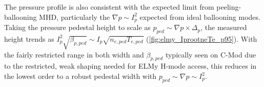 \documentclass[ twoside,openright,titlepage,numbers=noenddot,headinclude,%
                footinclude=true,cleardoublepage=empty,abstractoff, %
                BCOR=5mm,paper=letter,fontsize=11pt,%
                ngerman,american,%
                ]{scrreprt}
\begin{document}
\begin{figure}[h]
 \pushtooutside
\end{figure}

\noindent The pressure profile is also consistent with the expected limit from peeling-ballooning MHD, particularly the $\nabla p \sim I_p^2$ expected from ideal ballooning modes.  Taking the pressure pedestal height to scale as $p_{ped} \sim \nabla p \times \Delta_{p}$, the measured height trends as $I_p^2 \sqrt{\beta_{p,ped}} \sim I_p \sqrt{n_{e,ped} T_{e,ped}}$ (\cref{fig:elmy_IprootneTe_p95}).  With the fairly restricted range in both width and $\beta_{p,ped}$ typically seen on C-Mod due to the restricted, weak shaping needed for ELMy H-mode access, this reduces in the lowest order to a robust pedestal width with $p_{ped} \sim \nabla p \sim I_p^2$.

\begin{figure}[t]
 \pushtooutside
\end{figure}
\end{document}
